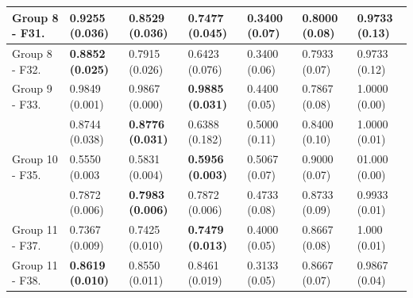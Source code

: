 \begin{center}
\begin{table}[!t]
\begin{tabular}{ccccccc}
		\multicolumn{1}{|l|}{Group 8 - F31.}           & \multicolumn{1}{l}{\textbf{0.9255 (0.036)}} & \multicolumn{1}{l}{0.8529 (0.036)} & \multicolumn{1}{l|}{0.7477 (0.045)}		& \multicolumn{1}{l}{0.3400 (0.07)} & \multicolumn{1}{l}{0.8000 (0.08)} & \multicolumn{1}{l|}{0.9733 (0.13)}  \\ \hline 		
		\multicolumn{1}{|l|}{Group 8 - F32.}              & \multicolumn{1}{l}{\textbf{0.8852 (0.025)}} & \multicolumn{1}{l}{0.7915 (0.026)} & \multicolumn{1}{l|}{0.6423 (0.076)}  		& \multicolumn{1}{l}{0.3400 (0.06)} & \multicolumn{1}{l}{0.7933 (0.07)} & \multicolumn{1}{l|}{0.9733 (0.12)}  \\ \hline 
		\multicolumn{1}{|l|}{Group 9 - F33.}  & \multicolumn{1}{l}{0.9849 (0.001)} & \multicolumn{1}{l}{0.9867 (0.000)} & \multicolumn{1}{l|}{\textbf{0.9885 (0.031)}}  		& \multicolumn{1}{l}{0.4400 (0.05)} & \multicolumn{1}{l}{0.7867 (0.08)} & \multicolumn{1}{l|}{1.0000 (0.00)} \\ \hline 		
		\rowcolor[gray]{.85}  \multicolumn{1}{|l|}{Group 9 - F34.}              & \multicolumn{1}{l}{0.8744 (0.038)} & \multicolumn{1}{l}{\textbf{0.8776 (0.031)}} & \multicolumn{1}{l|}{0.6388 (0.182)}  		& \multicolumn{1}{l}{0.5000 (0.11)} & \multicolumn{1}{l}{0.8400 (0.10)} & \multicolumn{1}{l|}{1.0000 (0.01)}  \\ \hline
		\multicolumn{1}{|l|}{Group 10 - F35.}  & \multicolumn{1}{l}{0.5550 (0.003} & \multicolumn{1}{l}{0.5831 (0.004)} & \multicolumn{1}{l|}{\textbf{0.5956 (0.003)}}  		& \multicolumn{1}{l}{0.5067 (0.07)} & \multicolumn{1}{l}{0.9000 (0.07)} & \multicolumn{1}{l|}{01.000 (0.00)} \\ \hline 		
		\rowcolor[gray]{.85}  \rowcolor[gray]{.85}  \multicolumn{1}{|l|}{Group 10 - F36.}              & \multicolumn{1}{l}{0.7872 (0.006)} & \multicolumn{1}{l}{\textbf{0.7983 (0.006)}} & \multicolumn{1}{l|}{0.7872 (0.006)}  		& \multicolumn{1}{l}{0.4733 (0.08)} & \multicolumn{1}{l}{0.8733 (0.09)} & \multicolumn{1}{l|}{0.9933 (0.01)}  \\ \hline
		\multicolumn{1}{|l|}{Group 11 - F37.}  & \multicolumn{1}{l}{0.7367 (0.009)} & \multicolumn{1}{l}{0.7425 (0.010)} & \multicolumn{1}{l|}{\textbf{0.7479 (0.013)}}  		& \multicolumn{1}{l}{0.4000 (0.05)} & \multicolumn{1}{l}{0.8667 (0.08)} & \multicolumn{1}{l|}{1.000 (0.01)} \\ \hline 		
		\multicolumn{1}{|l|}{Group 11 - F38.}              & \multicolumn{1}{l}{\textbf{0.8619 (0.010)}} & \multicolumn{1}{l}{0.8550 (0.011)} & \multicolumn{1}{l|}{0.8461 (0.019)}  		& \multicolumn{1}{l}{0.3133 (0.05)} & \multicolumn{1}{l}{0.8667 (0.07)} & \multicolumn{1}{l|}{0.9867 (0.04)}  \\ \hline

\end{tabular}
\end{table}
\end{center}
